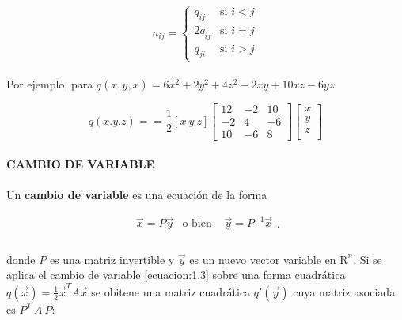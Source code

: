 \begin{equation}
a_{ij} = \left \{ 
    \begin{matrix} 
    q_{ij} & \mbox{si } i < j\\
    2q_{ij} & \mbox{si } i = j\\ 
    q_{ji} & \mbox{si } i > j
    \end{matrix}\right.
    \label{ecuacion:1.2}
\end{equation}

\paragraph*{}
Por ejemplo, para $q(x, y, x) = 6x^{2} + 2y^{2} + 4z^{2} - 2xy + 10xz - 6yz$

\begin{equation*}
q(x. y. z) = = \frac{1}{2}\left[x ~  y ~ z\right] 
\begin{bmatrix}
12 & -2 & 10\\
-2 & 4 & -6\\
10 & -6 & 8
\end{bmatrix}
\begin{bmatrix}
x\\
y\\
z\\
\end{bmatrix}
\end{equation*}

\paragraph*{}
\textbf{CAMBIO DE VARIABLE}

\paragraph*{}
Un \textbf{cambio de variable} es una ecuación de la forma

\begin{equation}
    \begin{matrix} 
    \overrightarrow{x} = P\overrightarrow{y} & \mbox{o bien } & \overrightarrow{y} = P^{-1}\overrightarrow{x}\\
    \end{matrix}.
    \label{ecuacion:1.3}
\end{equation}

\paragraph*{}
donde $P$ es una matriz invertible y $\overrightarrow{y}$ es un nuevo vector variable en $\mathrm{R}^{n}$. Si se aplica el cambio de variable \ref{ecuacion:1.3} sobre una forma cuadrática $q(\overrightarrow{x}) = \frac{1}{2}\overrightarrow{x}^{T}A\overrightarrow{x}$ se obitene una matriz cuadrática $q'(\overrightarrow{y})$ cuya matriz asociada es $P^{T} ~ A ~ P$:

